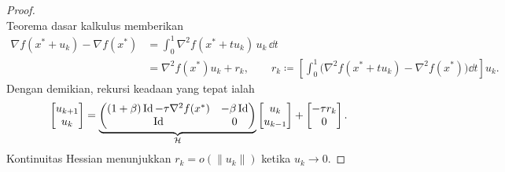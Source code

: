\begin{proof}
\begin{equation}
    \end{equation}
    Teorema dasar kalkulus memberikan
    \begin{equation}
        \begin{aligned}
            \nabla f(x^*+u_k)-\nabla f(x^*)
            &=\int_0^1\nabla^2f(x^*+tu_k)\,u_k\,\dd t\\
            &=\nabla^2f(x^*)u_k+r_k,\qquad
            r_k\coloneqq
            \left[\int_0^1
            \bigl(\nabla^2f(x^*+tu_k)-\nabla^2f(x^*)\bigr)\dd t\right]u_k.
        \end{aligned}
    \end{equation}
    Dengan demikian, rekursi keadaan yang tepat ialah
    \begin{equation}
        \begin{aligned}
            \begin{bmatrix}
                u_{k+1}\\
                u_k
            \end{bmatrix}
            &=
            \underbrace{\begin{pmatrix}
                (1+\beta)\operatorname{\mathrm{Id}}-\tau\nabla^2f(x^*)&-\beta\operatorname{\mathrm{Id}}\\
                \operatorname{\mathrm{Id}}&0
            \end{pmatrix}}_{\mathcal{H}}
            \begin{bmatrix}
                u_k\\
                u_{k-1}
            \end{bmatrix}
            +
            \begin{bmatrix}
                -\tau r_k\\
                0
            \end{bmatrix}.
        \end{aligned}
    \end{equation}
    Kontinuitas Hessian menunjukkan \(r_k=o(\|u_k\|)\) ketika \(u_k\rightarrow0\).


\end{proof}
